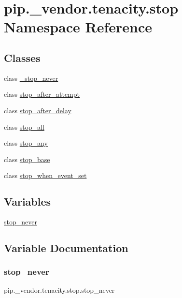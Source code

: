 \hypertarget{namespacepip_1_1__vendor_1_1tenacity_1_1stop}{}\section{pip.\+\_\+vendor.\+tenacity.\+stop Namespace Reference}
\label{namespacepip_1_1__vendor_1_1tenacity_1_1stop}
\subsection*{Classes}
\begin{DoxyCompactItemize}
\item 
class \hyperlink{classpip_1_1__vendor_1_1tenacity_1_1stop_1_1__stop__never}{\+\_\+stop\+\_\+never}
\item 
class \hyperlink{classpip_1_1__vendor_1_1tenacity_1_1stop_1_1stop__after__attempt}{stop\+\_\+after\+\_\+attempt}
\item 
class \hyperlink{classpip_1_1__vendor_1_1tenacity_1_1stop_1_1stop__after__delay}{stop\+\_\+after\+\_\+delay}
\item 
class \hyperlink{classpip_1_1__vendor_1_1tenacity_1_1stop_1_1stop__all}{stop\+\_\+all}
\item 
class \hyperlink{classpip_1_1__vendor_1_1tenacity_1_1stop_1_1stop__any}{stop\+\_\+any}
\item 
class \hyperlink{classpip_1_1__vendor_1_1tenacity_1_1stop_1_1stop__base}{stop\+\_\+base}
\item 
class \hyperlink{classpip_1_1__vendor_1_1tenacity_1_1stop_1_1stop__when__event__set}{stop\+\_\+when\+\_\+event\+\_\+set}
\end{DoxyCompactItemize}
\subsection*{Variables}
\begin{DoxyCompactItemize}
\item 
\hyperlink{namespacepip_1_1__vendor_1_1tenacity_1_1stop_a71e2754ff78d9f980f635d5ae45f0803}{stop\+\_\+never}
\end{DoxyCompactItemize}


\subsection{Variable Documentation}
\mbox{\label{namespacepip_1_1__vendor_1_1tenacity_1_1stop_a71e2754ff78d9f980f635d5ae45f0803}} 
\subsubsection{\texorpdfstring{stop\+\_\+never}{stop\_never}}
{\footnotesize\ttfamily pip.\+\_\+vendor.\+tenacity.\+stop.\+stop\+\_\+never}

